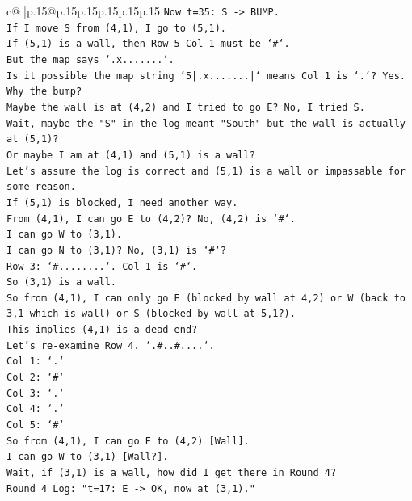 \documentclass{article}
\begin{document}
{\begin{supertabular}{c@{$\;$}|p{.15\linewidth}@{}p{.15\linewidth}p{.15\linewidth}p{.15\linewidth}p{.15\linewidth}p{.15\linewidth}}
{{{\texttt{Now t=35: S {-}> BUMP.} \\
\texttt{If I move S from (4,1), I go to (5,1).} \\
\texttt{If (5,1) is a wall, then Row 5 Col 1 must be `\#`.} \\
\texttt{But the map says `.x.......`.} \\
\texttt{Is it possible the map string `5|.x.......|` means Col 1 is `.`? Yes.} \\
\texttt{Why the bump?} \\
\texttt{Maybe the wall is at (4,2) and I tried to go E? No, I tried S.} \\
\texttt{Wait, maybe the "S" in the log meant "South" but the wall is actually at (5,1)?} \\
\texttt{Or maybe I am at (4,1) and (5,1) is a wall?} \\
\texttt{Let's assume the log is correct and (5,1) is a wall or impassable for some reason.} \\
\texttt{If (5,1) is blocked, I need another way.} \\
\texttt{From (4,1), I can go E to (4,2)? No, (4,2) is `\#`.} \\
\texttt{I can go W to (3,1).} \\
\texttt{I can go N to (3,1)? No, (3,1) is `\#`?} \\
\texttt{Row 3: `\#........`. Col 1 is `\#`.} \\
\texttt{So (3,1) is a wall.} \\
\texttt{So from (4,1), I can only go E (blocked by wall at 4,2) or W (back to 3,1 which is wall) or S (blocked by wall at 5,1?).} \\
\texttt{This implies (4,1) is a dead end?} \\
\texttt{Let's re{-}examine Row 4. `.\#..\#....`.} \\
\texttt{Col 1: `.`} \\
\texttt{Col 2: `\#`} \\
\texttt{Col 3: `.`} \\
\texttt{Col 4: `.`} \\
\texttt{Col 5: `\#`} \\
\texttt{So from (4,1), I can go E to (4,2) {[}Wall{]}.} \\
\texttt{I can go W to (3,1) {[}Wall?{]}.} \\
\texttt{Wait, if (3,1) is a wall, how did I get there in Round 4?} \\
\texttt{Round 4 Log: "t=17: E {-}> OK, now at (3,1)."} \\
}}}
\end{supertabular}}
\end{document}
